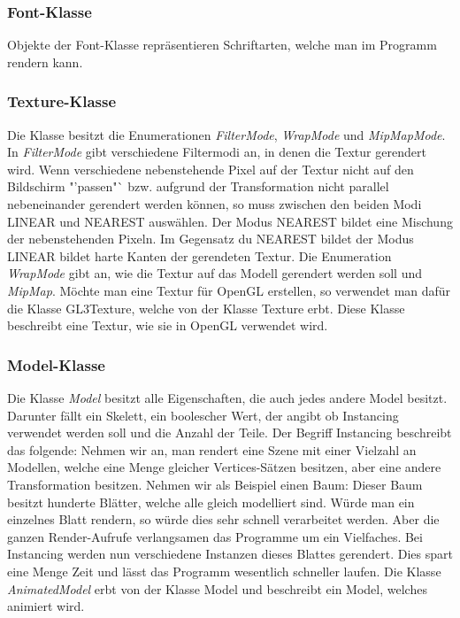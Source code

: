 \subsubsection{Font-Klasse}
\label{Fontclass}
Objekte der Font-Klasse repräsentieren Schriftarten, welche man im Programm rendern kann.

\subsubsection{Texture-Klasse}
\label{Textureclass}
Die Klasse besitzt die Enumerationen \textit{FilterMode}, \textit{WrapMode} und \textit{MipMapMode}. In \textit{FilterMode} gibt verschiedene Filtermodi an, in denen die Textur gerendert wird.
Wenn verschiedene nebenstehende Pixel auf der Textur nicht auf den Bildschirm "'passen"` bzw. aufgrund der Transformation nicht parallel nebeneinander gerendert werden können, so muss zwischen den beiden Modi LINEAR und NEAREST auswählen. Der Modus NEAREST bildet eine Mischung der nebenstehenden Pixeln. 
Im Gegensatz du NEAREST bildet der Modus LINEAR bildet harte Kanten der gerendeten Textur.
Die Enumeration \textit{WrapMode} gibt an, wie die Textur auf das Modell gerendert werden soll und \textit{MipMap}.
Möchte man eine Textur für OpenGL erstellen, so verwendet man dafür die Klasse GL3Texture, welche von der Klasse Texture erbt. Diese Klasse beschreibt eine Textur, wie sie in OpenGL verwendet wird.

\subsubsection{Model-Klasse}
\label{Modelclass}
Die Klasse \textit{Model} besitzt alle Eigenschaften, die auch jedes andere Model besitzt. Darunter fällt ein Skelett, ein boolescher Wert, der angibt ob Instancing verwendet werden soll und die Anzahl der Teile. 
Der Begriff Instancing beschreibt das folgende:
Nehmen wir an, man rendert eine Szene mit einer Vielzahl an Modellen, welche eine Menge gleicher Vertices-Sätzen besitzen, aber eine andere Transformation besitzen.
Nehmen wir als Beispiel einen Baum:
Dieser Baum besitzt hunderte Blätter, welche alle gleich modelliert sind. Würde man ein einzelnes Blatt rendern, so würde dies sehr schnell verarbeitet werden. Aber die ganzen Render-Aufrufe verlangsamen das Programme um ein Vielfaches. 
Bei Instancing werden nun verschiedene Instanzen dieses Blattes gerendert. Dies spart eine Menge Zeit und lässt das Programm wesentlich schneller laufen.
Die Klasse \textit{AnimatedModel} erbt von der Klasse Model und beschreibt ein Model, welches animiert wird.

